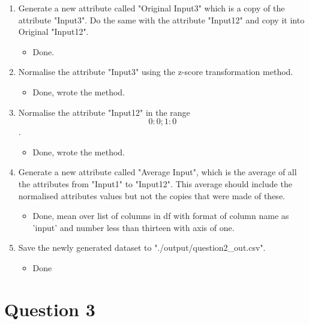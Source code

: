 \documentclass{scrreprt}
\begin{document}
\begin{enumerate}
	\item Generate a new attribute called "Original Input3" which is a copy of the attribute "Input3". Do the same with the attribute "Input12" and copy it into Original "Input12".
	\begin{itemize}
		\item Done.
	\end{itemize}
	\item Normalise the attribute "Input3" using the z-score transformation method.
	\begin{itemize}
		\item Done, wrote the method.
	\end{itemize}
	
	\item Normalise the attribute "Input12" in the range \[ 0:0; 1:0\].
	\begin{itemize}
		\item Done, wrote the method.
	\end{itemize}
	
	\item Generate a new attribute called "Average Input", which is the average of all the attributes
	from "Input1" to "Input12". This average should include the normalised attributes values but not the copies that were made of these.
	\begin{itemize}
		\item Done, mean over list of columns in df with format of column name as 'input' and number less than thirteen with axis of one.
	\end{itemize}
	
	\item Save the newly generated dataset to "./output/question2\_out.csv".
	\begin{itemize}
		\item Done
	\end{itemize}
	
\end{enumerate}

\newpage	
\chapter{Question 3}
\end{document}
